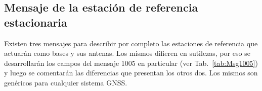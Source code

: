 \documentclass[a4paper,12pt,oneside,onecolumn,final,openright]{book}%
\begin{document}
\subsection{Mensaje de la estación de referencia estacionaria}
	Existen tres mensajes para describir por completo las estaciones de referencia que actuarán como bases y sus antenas.
	Los mismos difieren en sutilezas, por eso se desarrollarán los campos del mensaje 1005 en particular (ver Tab.~\ref{tab:Msg1005}) y luego se comentarán las diferencias que presentan los otros dos. Los mismos son genéricos para cualquier sistema GNSS. 
\end{document}
